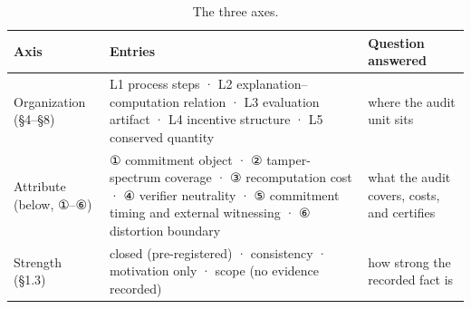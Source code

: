 \documentclass[11pt,a4paper]{article}
\begin{document}
\begin{table}[htbp]
\centering
\footnotesize
\setlength{\tabcolsep}{3.5pt}
\renewcommand{\arraystretch}{1.18}
\begin{tabularx}{0.985\textwidth}{>{\raggedright\arraybackslash}p{} >{\raggedright\arraybackslash}X >{\raggedright\arraybackslash}p{}}
\toprule
\textbf{Axis} & \textbf{Entries} & \textbf{Question answered} \\
\midrule
Organization (§4–§8) & L1 process steps · L2 explanation–computation relation · L3 evaluation artifact · L4 incentive structure · L5 conserved quantity & where the audit unit sits \\
Attribute (below, ①–⑥) & ① commitment object · ② tamper-spectrum coverage · ③ recomputation cost · ④ verifier neutrality · ⑤ commitment timing and external witnessing · ⑥ distortion boundary & what the audit covers, costs, and certifies \\
Strength (§1.3) & closed (pre-registered) · consistency · motivation only · scope (no evidence recorded) & how strong the recorded fact is \\
\bottomrule
\end{tabularx}
\caption{The three axes.}
\label{tab:T1}
\end{table}
\end{document}
